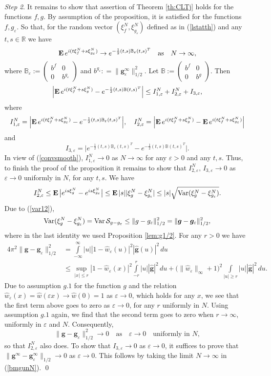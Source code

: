 \documentclass{article}
\numberwithin{equation}{section}
\newcommand{\mR}{\mathbb{R}}
\newcommand{\mB}{\mathbb{B}}
\newcommand{\SSS}{{\cal S}}
\newcommand{\eps}{\varepsilon}
\newcommand{\Var}{\operatorname{Var}}
\newcommand{\MO}{\mbox{\bf E}\,}
\newcommand{\ra}{\rightarrow}
\newcommand{\fr}{\frac}
\newcommand{\qmb}{\quad\mbox}
\newcommand{\qu}{\quad}
\newcommand{\ili}{\int\limits}
\newcommand{\ilif}{\ili_{-\infty}^\infty}
\newcommand{\lbl}{\label}
\newcommand{\ass}{\quad\mbox{as}\quad}
\newcommand{\rprop}{Proposition \nolinebreak}
\newcommand{\rtheo}{Theorem \nolinebreak}
\newcommand{\bee}{\begin{equation}}
\newcommand{\eee}{\end{equation}}
\begin{document}
{\it Step 2}. 
It remains to show that 
assertion of \rtheo\ref{th:CLTj} holds for the
functions $f,g$.
By assumption of the proposition,
it is satisfied for the
functions $f,g_{\eps}$.
So that,
for the random vector $(\xi^N_f, \xi^N_{g_\eps})$ defined as in
(\ref{lstatth})
and any $t,s\in\mR$  we have
\bee\lbl{convsmooth}
\MO e^{i(t\xi^N_f + s\xi^N_{g_\eps})}
\ra e^{-\fr{1}{2}(t,s)\mB_\eps(t,s)^T}
\ass N\ra\infty,
\eee
where
$\mB_{\eps}:=
\begin{pmatrix}
b^f & 0 \\
0& b^{g_\eps}
\end{pmatrix}$
and
$b^{g_\eps}: = \|\bm g_{\eps}^\infty\|_{1/2}^2$.
Let 
$\mB:=
\begin{pmatrix}
b^f & 0 \\
0& b^{g}
\end{pmatrix}$.
Then
$$
\Big| \MO e^{i(t\xi^N_f + s\xi^N_{g})} - e^{-\fr{1}{2}(t,s)\mB(t,s)^T} \Big|
\leq
I^N_{1,\eps} + I^N_{2,\eps} + I_{3,\eps},
$$
where
$$
I^N_{1,\eps} =
\Big| \MO e^{i(t\xi^N_f + s\xi^N_{g_\eps})} - e^{-\fr{1}{2}(t,s)\mB_{\eps}(t,s)^T} \Big|,
\qu
I^N_{2,\eps} =
\Big| \MO e^{i(t\xi^N_f+ s\xi^N_{g})}- \MO e^{i(t\xi^N_f + s\xi^N_{g_\eps})}\Big|
$$
and
$$
I_{3,\eps} =
\Big| e^{-\fr{1}{2}(t,s)\mB_{\eps}(t,s)^T}- e^{-\fr{1}{2}(t,s)\mB(t,s)^T} \Big|.
$$
In view of (\ref{convsmooth}), $I_{1,\eps}^N\ra 0$ as $N\ra\infty$ for any $\eps>0$ and any $t,s$.
Thus, to finish the proof of the proposition
it remains to show that
$I_{2,\eps}^N,\, I_{3,\eps}\ra 0$ as $\eps\ra 0$ uniformly in $N$,
for any $t,s$.
We have
$$
I^N_{2,\eps}
\leq \MO \big| e^{is\xi^N_{g}} - e^{is\xi^N_{g_\eps}} \big|
\leq \MO |s||\xi^N_{g} - \xi^N_{g_\eps}|
\leq |s|\sqrt{\Var (\xi^N_{g}-\xi^N_{g_{\eps}})}.
$$
Due to (\ref{var12}),
$$
\Var (\xi^N_{g}-\xi^N_{g_{\eps}})
=\Var \SSS_{g-g_{\eps}}
\leq \|g-g_{\eps}\|_{1/2}^2=\|\bm g- \bm g_{\eps}\|_{1/2}^2,
$$
where in the last identity we used \rprop\ref{lem:g1/2}.
For any $r>0$ we have
\begin{align*}
4\pi^2\|\bm g- \bm g_{\eps}\|_{1/2}^2
&	=\ilif |u||1-\hat w_\eps(u)|^2|\hat{\bm g} (u)|^2 \,du
\\
&\leq \sup\limits_{|x|\leq r} |1-\hat w_\eps(x)|^2
\ili_{-r}^r |u| |\hat{\bm g}|^2 \,du
+ (\|\hat w_\eps\|_\infty+1\big)^2\ili_{|u|\geq r} |u||\hat {\bm g}|^2 \,du.
\end{align*}
Due to assumption $g.1$ for the function $g$ and
the relation $\hat w_\eps(x)=\hat w(\eps x)\ra \hat w(0)=1$ as $\eps\ra 0$, which holds for any $x$, we see that the first term above goes to zero as $\eps\ra 0$, for any $r$ uniformly in $N$.
Using assumption $g.1$ again, we find that the second term goes to zero when $r\ra\infty$,
uniformly in $\eps$ and $N$.  Consequently,
\bee\lbl{bmgunN}
\|\bm g- \bm g_{\eps}\|_{1/2}^2 \ra 0 \ass \eps\ra 0
\qmb{uniformly in $N$},
\eee
so that $I^N_{2,\eps}$ also does.
To show that $I_{3,\eps}\ra 0$ as $\eps\ra 0$,
it suffices to prove that
$\|\bm g^\infty- \bm g^\infty_{\eps}\|_{1/2}\ra 0$ as $\eps\ra 0$.
This follows by taking the limit $N\ra\infty$ in (\ref{bmgunN}).
\qed
\end{document}
